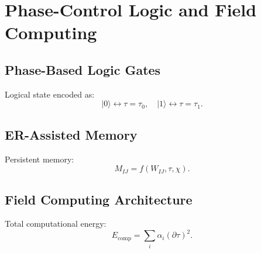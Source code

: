 \chapter{Phase-Control Logic and Field Computing}

\section{Phase-Based Logic Gates}
Logical state encoded as:
\[
|0\rangle \leftrightarrow \tau=\tau_0,
\quad
|1\rangle \leftrightarrow \tau=\tau_1.
\]

\section{ER-Assisted Memory}
Persistent memory:
\[
M_{IJ} = f(W_{IJ},\tau,\chi).
\]

\section{Field Computing Architecture}
Total computational energy:
\[
E_{\mathrm{comp}} = \sum_i \alpha_i (\partial\tau)^2.
\]
